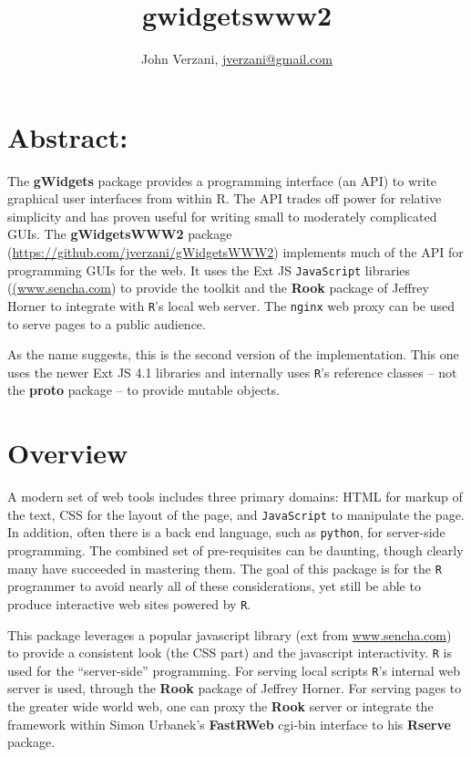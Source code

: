 \documentclass[12pt]{article}
\newcommand{\pkg}[1]{\textbf{#1}}
\newcommand{\code}[1]{\texttt{#1}}
\newcommand{\proglang}[1]{\code{#1}}
\newcommand{\R}{\proglang{R}}
\newcommand{\javascript}{\proglang{JavaScript}}
\begin{document}
\thispagestyle{plain}
\title{gwidgetswww2}

\author{John Verzani, \url{jverzani@gmail.com}}






\section*{Abstract:}
The \pkg{gWidgets} package provides a programming interface (an API)
to write graphical user interfaces from within R. The API trades off
power for relative simplicity and has proven useful for writing small
to moderately complicated GUIs. The \pkg{gWidgetsWWW2} package
(\url{https://github.com/jverzani/gWidgetsWWW2}) implements much of
the API for programming GUIs for the web. It uses the Ext JS
\javascript{} libraries (\url{(www.sencha.com}) to provide the toolkit
and the \pkg{Rook} package of Jeffrey Horner to integrate with \R's
local web server. The \code{nginx} web proxy can be used to serve
pages to a public audience.

As the name suggests, this is the second version of the
implementation. This one uses the newer Ext JS 4.1 libraries and
internally  uses \R's reference classes -- not the \pkg{proto} package
-- to provide mutable objects.


\section{Overview}

A modern set of web tools includes three primary domains: HTML for
markup of the text, CSS for the layout of the page, and \javascript{} to
manipulate the page. In addition, often there is a back end language,
such as \proglang{python}, for server-side programming. The combined
set of pre-requisites can be daunting, though clearly many have
succeeded in mastering them. The goal of this package is for the \R{}
programmer to avoid nearly all of these considerations, yet still be
able to produce interactive web sites powered by \R.

This package leverages a popular javascript library (ext from
\url{www.sencha.com}) to provide a consistent look (the CSS part) and
the javascript interactivity. \R{} is used for the ``server-side''
programming.  For serving local scripts \R's internal web server is used,
through the \pkg{Rook} package of Jeffrey Horner. For serving pages to
the greater wide world web, one can proxy the \pkg{Rook} server or
integrate the framework within Simon Urbanek's \pkg{FastRWeb} cgi-bin
interface to his \pkg{Rserve} package.
\end{document}
